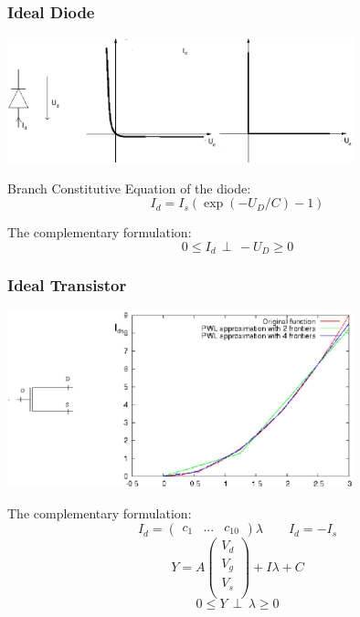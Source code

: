 \frame
{
  \frametitle{Ideal Diode}
   \centerline{
  \includegraphics[width=100mm]{diode.eps}
  }
   \begin{block}{Branch Constitutive Equation of the diode:}
  \[ I_d =I_{s}(\exp{(-U_{D}/C)}-1)\]
  \end{block}
   \begin{block}{The complementary formulation:}
  \[0 \leq I_d \, \perp \, -U_{D} \geq 0\]
  \end{block}

}
\frame
{
  \frametitle{Ideal Transistor}
   \centerline{
  \includegraphics[width=100mm]{def2.eps}
  }
   \begin{block}{The complementary formulation:}
  \[ I_{d} = \left(\begin{array}{ccc}
  c_{1}&...&c_{10}\end{array}\right)\lambda \qquad  I_{d} = -I_{s}\]
  \[Y=A\left(\begin{array}{c}
  V_{d}\\
  V_{g}\\
  V_{s}\\\end{array}\right)+I\lambda + C\]
  \[0 \leq Y \, \perp \, \lambda \geq 0\]
  \end{block}

}
